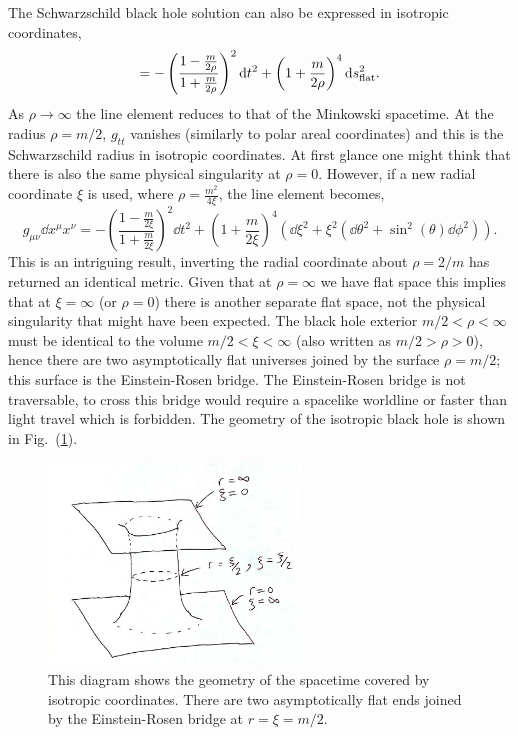 The Schwarzschild black hole solution can also be expressed in isotropic coordinates,
\begin{align} \label{intro:eq:iso_bh}
= -\left(\frac{1-\frac{m}{2\rho}}{1+\frac{m}{2\rho}} \right)^2 \dd t^2 + \left(1+\frac{m}{2\rho} \right)^4 \dd s_{\rm flat}^2.
\end{align}
As $\rho \rightarrow \infty$ the line element reduces to that of the Minkowski spacetime. At the radius $\rho= m/2$, $g_{tt}$ vanishes (similarly to polar areal coordinates) and this is the Schwarzschild radius in isotropic coordinates. At first glance one might think that there is also the same physical singularity at $\rho=0$. However, if a new radial coordinate $\xi$ is used, where $\rho = \frac{m^2}{4\xi}$, the line element becomes, 
\begin{equation}
g_{\mu\nu} \dd x^\mu x^\nu = -\left(\frac{1-\frac{m}{2\xi}}{1+\frac{m}{2\xi}} \right)^2 \dd t^2 + \left(1+\frac{m}{2\xi} \right)^4 \left(\dd \xi^2 + \xi^2(\dd \theta^2 + \sin^2 (\theta) \dd \phi^2) \right).
\end{equation}
This is an intriguing result, inverting the radial coordinate about $\rho=2/m$ has returned an identical metric. Given that at $\rho=\infty$ we have flat space this implies that at $\xi=\infty$ (or $\rho=0$) there is another separate flat space, not the physical singularity that might have been expected. The black hole exterior $m/2<\rho<\infty$ must be identical to the volume $m/2<\xi<\infty$ (also written as $m/2>\rho>0$), hence there are two asymptotically flat universes joined by the surface $\rho=m/2$; this surface is the Einstein-Rosen bridge. The Einstein-Rosen bridge is not traversable, to cross this bridge would require a spacelike worldline or faster than light travel which is forbidden. The geometry of the isotropic black hole is shown in Fig.~(\ref{intro:fig:scbh_er}).

\begin{figure}[h!]
\centering
    \includegraphics[width=0.6\textwidth]{png/scbh_er_bridge.png}
    \caption{This diagram shows the geometry of the spacetime covered by isotropic coordinates. There are two asymptotically flat ends joined by the Einstein-Rosen bridge at $r=\xi=m/2$.}
    \label{intro:fig:scbh_er}
\end{figure}

